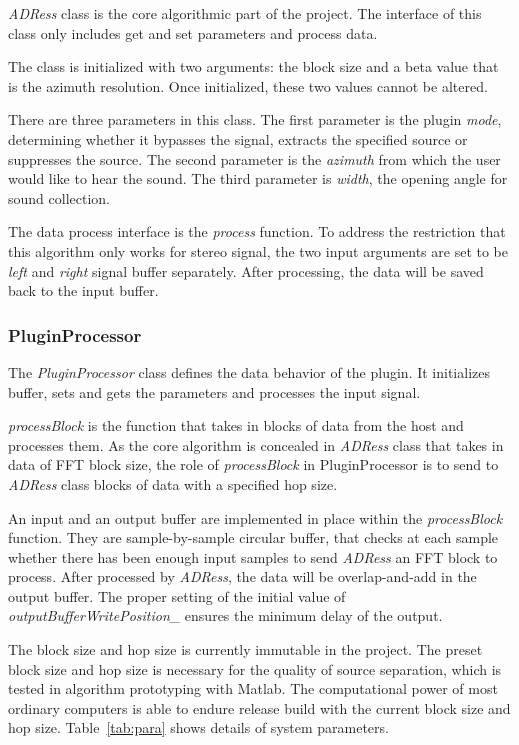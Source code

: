 \documentclass{sig-alternate}
\begin{document}
\textsl{ADRess} class is the core algorithmic part of the project. The interface of this class only includes get and set parameters and process data.

The class is initialized with two arguments: the block size and a beta value that is the azimuth resolution. Once initialized, these two values cannot be altered.
     
There are three parameters in this class. The first parameter is the plugin \textsl{mode}, determining whether it bypasses the signal, extracts the specified source or suppresses the source. The second parameter is the \textsl{azimuth} from which the user would like to hear the sound. The third parameter is \textsl{width}, the opening angle for sound collection. 
 
The data process interface is the \textsl{process} function. To address the restriction that this algorithm only works for stereo signal, the two input arguments are set to be \textsl{left} and \textsl{right} signal buffer separately. After processing, the data will be saved back to the input buffer.

\subsubsection{PluginProcessor}

The \textsl{PluginProcessor} class defines the data behavior of the plugin. It initializes buffer, sets and gets the parameters and processes the input signal. 
     
\textsl{processBlock} is the function that takes in blocks of data from the host and processes them. As the core algorithm is concealed in \textsl{ADRess} class that takes in data of FFT block size, the role of \textsl{processBlock} in {PluginProcessor} is to send to \textsl{ADRess} class blocks of data with a specified hop size.
     
An input and an output buffer are implemented in place within the \textsl{processBlock} function. They are sample-by-sample circular buffer, that checks at each sample whether there has been enough input samples to send \textsl{ADRess} an FFT block to process. After processed by \textsl{ADRess}, the data will be overlap-and-add in the output buffer. The proper setting of the initial value of \textsl{outputBufferWritePosition\_} ensures the minimum delay of the output.

The block size and hop size is currently immutable in the project. The preset block size and hop size is necessary for the quality of source separation, which is tested in algorithm prototyping with Matlab. The computational power of most ordinary computers is able to endure release build with the current block size and hop size. Table~\ref{tab:para} shows details of system parameters.
\end{document}
